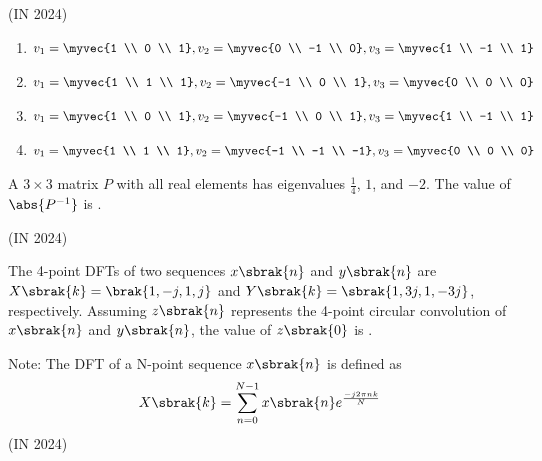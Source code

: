     \hfill{(IN 2024)}
    \begin{enumerate}
        \item 
        \begin{align*}
        v_1 = \myvec{1 \\ 0 \\ 1}, v_2 = \myvec{0 \\ -1 \\ 0}, v_3 = \myvec{1 \\ -1 \\ 1}
        \end{align*}
        \item 
        \begin{align*}
        v_1 = \myvec{1 \\ 1 \\ 1}, v_2 = \myvec{-1 \\ 0 \\ 1}, v_3 = \myvec{0 \\ 0 \\ 0}
        \end{align*}
        \item
        \begin{align*}
        v_1 = \myvec{1 \\ 0 \\ 1}, v_2 = \myvec{-1 \\ 0 \\ 1}, v_3 = \myvec{1 \\ -1 \\ 1}
        \end{align*}
        \item
        \begin{align*}
        v_1 = \myvec{1 \\ 1 \\ 1}, v_2 = \myvec{-1 \\ -1 \\ -1}, v_3 = \myvec{0 \\ 0 \\ 0}
        \end{align*}
    \end{enumerate}
    \item A $3 \times 3$ matrix $P$ with all real elements has eigenvalues $\frac{1}{4}$, $1$, and $-2$. The value of $\abs{P^{-1}}$ is \underline{\hspace{2cm}} .
    
    \hfill{(IN 2024)}
    \item The 4-point DFTs of two sequences $x\sbrak{n}$ and $y\sbrak{n}$ are $X\sbrak{k} = \brak{1, -j, 1, j}$ and $Y\sbrak{k} = \sbrak{1, 3j, 1, -3j}$, respectively. Assuming $z\sbrak{n}$ represents the 4-point circular convolution of $x\sbrak{n}$ and $y\sbrak{n}$, the value of $z\sbrak{0}$ is \underline{\hspace{2cm}} .
    
    Note: The DFT of a N-point sequence $x\sbrak{n}$ is defined as
    \begin{align*}
        X\sbrak{k} = \sum_{n=0}^{N-1} x\sbrak{n} e^{\frac{-j2\pi nk}{N}}
    \end{align*}
    \hfill{(IN 2024)}
